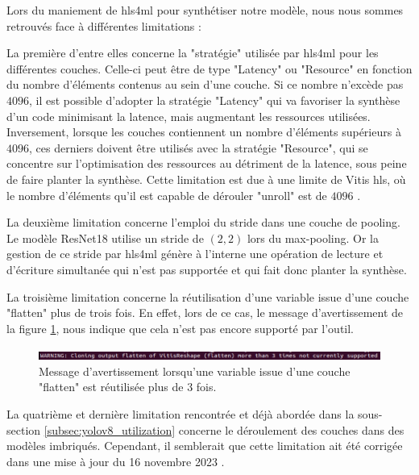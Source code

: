 Lors du maniement de \acrshort{hls4ml} pour synthétiser notre modèle, nous nous sommes retrouvés face à différentes limitations :

La première d'entre elles concerne la "stratégie" utilisée par \acrshort{hls4ml} pour les différentes couches. Celle-ci peut être de type "Latency" ou "Resource" en fonction du nombre d'éléments contenus au sein d'une couche. Si ce nombre n'excède pas $4096$, il est possible d'adopter la stratégie "Latency" qui va favoriser la synthèse d'un code minimisant la latence, mais augmentant les ressources utilisées.
Inversement, lorsque les couches contiennent un nombre d'éléments supérieurs à $4096$, ces derniers doivent être utilisés avec la stratégie "Resource", qui se concentre sur l'optimisation des ressources au détriment de la latence, sous peine de faire planter la synthèse. Cette limitation est due à une limite de Vitis \acrshort{hls}, où le nombre d'éléments qu'il est capable de dérouler "unroll" est de $4096$ \cite{noauthor_hls4ml-tutorialpart6_cnnsipynb_nodate}.

La deuxième limitation concerne l'emploi du stride dans une couche de pooling. Le modèle ResNet18 utilise un stride de $(2,2)$ lors du max-pooling. Or la gestion de ce stride par \acrshort{hls4ml} génère à l'interne une opération de lecture et d'écriture simultanée qui n'est pas supportée et qui fait donc planter la synthèse.

La troisième limitation concerne la réutilisation d'une variable issue d'une couche "flatten" plus de trois fois. En effet, lors de ce cas, le message d'avertissement de la figure \ref{fig:warning_reuse_of_variable}, nous indique que cela n'est pas encore supporté par l'outil.

\begin{figure}[hbt!]
    \centering
    \includegraphics[scale=0.45]{Figures/hls4ml/warning_reuse_of_variable.png}
    \caption{Message d'avertissement lorsqu'une variable issue d'une couche "flatten" est réutilisée plus de $3$ fois.}
    \label{fig:warning_reuse_of_variable}
\end{figure}

La quatrième et dernière limitation rencontrée et déjà abordée dans la sous-section \ref{subsec:yolov8_utilization} concerne le déroulement des couches dans des modèles imbriqués. Cependant, il semblerait que cette limitation ait été corrigée dans une mise à jour du 16 novembre 2023 \cite{noauthor_release_nodate}.

